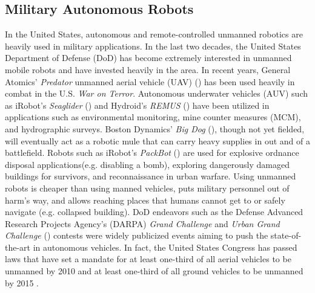 \subsection{Military Autonomous Robots}
In the United States, autonomous and remote-controlled unmanned robotics are heavily used in military applications. In the last two decades, the United States Department of Defense (DoD) has become extremely interested in unmanned mobile robots and have invested heavily in the area. In recent years, General Atomics' \textit{Predator} unmanned aerial vehicle (UAV) () has been used heavily in combat in the U.S. \textit{War on Terror}. Autonomous underwater vehicles (AUV) such as iRobot's \textit{Seaglider} () and Hydroid's \textit{REMUS} () have been utilized in applications such as environmental monitoring, mine counter measures (MCM), and hydrographic surveys. Boston Dynamics' \textit{Big Dog} (), though not yet fielded, will eventually act as a robotic mule that can carry heavy supplies in out and of a battlefield. Robots such as iRobot's \textit{PackBot} () are used for explosive ordnance disposal applications(e.g. disabling a bomb), exploring dangerously damaged buildings for survivors, and reconnaissance in urban warfare. Using unmanned robots is cheaper than using manned vehicles, puts military personnel out of harm's way, and allows reaching places that humans cannot get to or safely navigate (e.g. collapsed building). DoD endeavors such as the Defense Advanced Research Projects Agency's (DARPA) \textit{Grand Challenge} and \textit{Urban Grand Challenge} () contests were widely publicized events aiming to push the state-of-the-art in autonomous vehicles. In fact, the United States Congress has passed laws that have set a mandate for at least one-third of all aerial vehicles to be unmanned by 2010 and at least one-third of all ground vehicles to be unmanned by 2015 \citep{roblaird:evolvingdodunmanned}.



